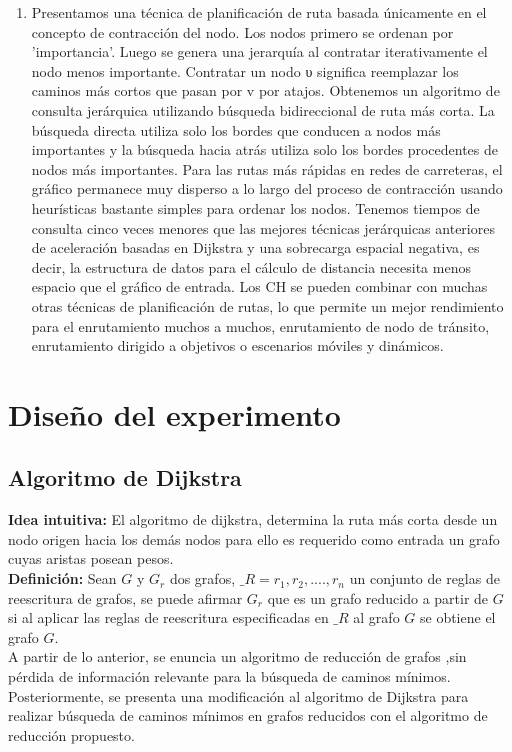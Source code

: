 \documentclass[a4,papper]{IEEEtran}
\begin{document}
\begin{enumerate}
\begin{enumerate}
\item Presentamos una técnica de planificación de ruta basada únicamente en el concepto de contracción del nodo. Los nodos primero se ordenan por 'importancia'. Luego se genera una jerarquía al contratar iterativamente el nodo menos importante. Contratar un nodo υ significa reemplazar los caminos más cortos que pasan por v por atajos. Obtenemos un algoritmo de consulta jerárquica utilizando búsqueda bidireccional de ruta más corta. La búsqueda directa utiliza solo los bordes que conducen a nodos más importantes y la búsqueda hacia atrás utiliza solo los bordes procedentes de nodos más importantes. Para las rutas más rápidas en redes de carreteras, el gráfico permanece muy disperso a lo largo del proceso de contracción usando heurísticas bastante simples para ordenar los nodos. Tenemos tiempos de consulta cinco veces menores que las mejores técnicas jerárquicas anteriores de aceleración basadas en Dijkstra y una sobrecarga espacial negativa, es decir, la estructura de datos para el cálculo de distancia necesita menos espacio que el gráfico de entrada. Los CH se pueden combinar con muchas otras técnicas de planificación de rutas, lo que permite un mejor rendimiento para el enrutamiento muchos a muchos, enrutamiento de nodo de tránsito, enrutamiento dirigido a objetivos o escenarios móviles y dinámicos.
\end{enumerate}
\end{enumerate}

\IEEEPARstart{}

\section{Diseño del experimento}
\subsection{\bf{Algoritmo de Dijkstra}}
{ \noindent \bf Idea intuitiva:}
El algoritmo de dijkstra, determina la ruta más corta desde un nodo origen hacia los demás nodos para ello es requerido como entrada un grafo cuyas aristas posean pesos.\\
{\bf Definición:}
Sean $G$ y $G_r$ dos grafos, $\mathbb_{R}={r_1,r_2,....,r_n}$ un conjunto de reglas de reescritura de grafos, se puede afirmar $G_r$ que es un grafo reducido a partir de $G$ si al aplicar las reglas de reescritura especificadas en $\mathbb_{R}$ al grafo $G$ se obtiene el grafo $G$.\\

\noindent A partir de lo anterior, se enuncia un algoritmo de reducción de grafos ,sin pérdida de información relevante para la búsqueda de caminos mínimos. Posteriormente, se presenta una modificación al algoritmo de Dijkstra para realizar búsqueda de caminos mínimos en grafos reducidos con el algoritmo de reducción propuesto.
\end{document}
